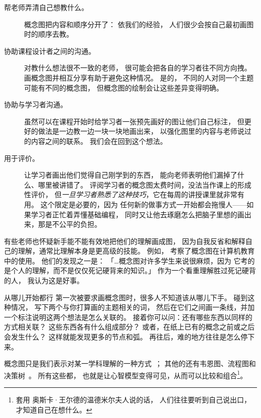 \begin{description}

\item[帮老师弄清自己想教什么。]
  概念图把内容和顺序分开了：
  依我们的经验，
  人们很少会按自己最初画图时的顺序去教。

\item[协助课程设计者之间的沟通。]
  对教什么想法很不一致的老师，
  很可能会把各自的学习者往不同方向拽。
  画概念图并相互分享有助于避免这种情况。
  是的，
  不同的人对同一个主题可能有不同的概念图，
  但概念图的绘制会让这些差异变得明确。

\item[协助与学习者沟通。]
  虽然可以在课程开始时给学习者一张预先画好的图让他们自己标注，
  但更好的做法是一边教一边一块一块地画出来，
  以强化图里的内容与老师说过的内容之间的联系。
  我们会在回到这个想法。

\item[用于评价。]
  让学习者画出他们觉得自己刚学到的东西，
  能向老师表明他们漏掉了什么、哪里被讲错了。
  评阅学习者的概念图太费时间，没法当作课上的形成性评价，
  但\emph{一旦学习者熟悉了这种技巧}，它在每周的讲授课里就非常有用。
  这个限定是必要的，因为
  任何新的做事方式一开始都会拖慢人——如果学习者正忙着弄懂基础编程，
  同时又让他去琢磨怎么把脑子里想的画出来，那是不公平的负担。

\end{description}

有些老师也怀疑新手能不能有效地把他们的理解画成图，
因为自我反省和解释自己的理解，通常比理解本身是更高级的技能。
例如，
\cite{Kepp2008}考察了概念图在计算机教育中的使用。
他们的发现之一是：
「{\ldots}概念图对许多学生来说很麻烦，因为
它考的是个人的理解，而不是仅仅死记硬背来的知识。」
作为一个看重理解胜过死记硬背的人，
我认为这是好事。

\begin{aside}{从哪儿开始都行}
  第一次被要求画概念图时，很多人不知道该从哪儿下手。
  碰到这种情况，
  写下两个与你打算画的主题相关的词，
  然后在它们之间画一条线，并加一个标注说明这两个想法是怎么关联的。
  接着你可以问：还有哪些东西以同样的方式相关联？
  这些东西各有什么组成部分？
  或者，在纸上已有的概念之前或之后会发生什么？
  这样就能发现更多的节点和弧。
  再往后，难的地方往往是怎么停下来。
\end{aside}

概念图只是我们表示对某一学科理解的一种方式~\cite{Eppl2006}；
其他的还有韦恩图、流程图和决策树~\cite{Abel2009}。
所有这些都，
也就是让心智模型变得可见，从而可以比较和组合\footnote{套用
奥斯卡·王尔德的温德米尔夫人说的话，
人们往往要听到自己说出口，才知道自己在想什么。}。

